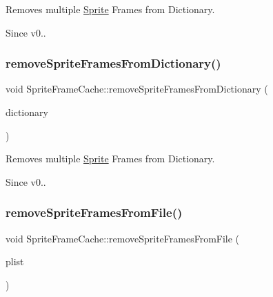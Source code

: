 Removes multiple \hyperlink{classSprite}{Sprite} Frames from Dictionary. \begin{DoxySince}{Since}
v0.. 
\end{DoxySince}
\mbox{\label{classSpriteFrameCache_ad9903fd9759969671fefe7721f3a7071}} 
\subsubsection{\texorpdfstring{remove\+Sprite\+Frames\+From\+Dictionary()}{removeSpriteFramesFromDictionary()}\hspace{0.1cm}{\footnotesize\ttfamily [2/2]}}
{\footnotesize\ttfamily void Sprite\+Frame\+Cache\+::remove\+Sprite\+Frames\+From\+Dictionary (\begin{DoxyParamCaption}\item[{Value\+Map \&}]{dictionary }\end{DoxyParamCaption})\hspace{0.3cm}{\ttfamily [protected]}}

Removes multiple \hyperlink{classSprite}{Sprite} Frames from Dictionary. \begin{DoxySince}{Since}
v0.. 
\end{DoxySince}
\mbox{\label{classSpriteFrameCache_a1edf0ddf258ccb7ea843379f5b99aac5}} 
\subsubsection{\texorpdfstring{remove\+Sprite\+Frames\+From\+File()}{removeSpriteFramesFromFile()}\hspace{0.1cm}{\footnotesize\ttfamily [1/2]}}
{\footnotesize\ttfamily void Sprite\+Frame\+Cache\+::remove\+Sprite\+Frames\+From\+File (\begin{DoxyParamCaption}\item[{const std\+::string \&}]{plist }\end{DoxyParamCaption})}


